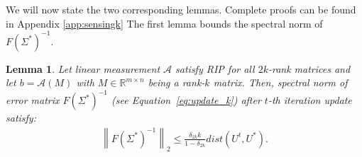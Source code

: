 \documentclass[11pt]{article}
\renewcommand{\eqref}[1]{\hyperref[#1]{(\ref*{#1})}}
\theoremstyle{plain}
\newtheorem{lemma}[theorem]{Lemma}
\theoremstyle{definition}
\newcommand{\rmn}{\mathbb{R}^{m \times n}}
\newcommand{\eqdef}{\stackrel{\textrm{def}}{=}}
\newcommand{\dist}{\mathrm{dist}}
\newcommand{\twonorm}[1]{\left\| {#1} \right\|_2}
\newcommand{\calA}{\mathcal{A}}
\newcommand{\aff}{{\mathcal A}}
\begin{document}
We will now state the two corresponding lemmas.
Complete proofs can be found in Appendix \ref{app:sensingk}
The first lemma bounds the spectral norm of $F(\Sigma^*)^{-1}$.
\begin{lemma}\label{lemma:sensing-twonorm-F}
Let linear measurement $\aff$ satisfy RIP for all $2k$-rank matrices and let $b=\aff(M)$ with $M\in \rmn$ being a rank-$k$ matrix. Then, spectral norm of error matrix $F(\Sigma^*)^{-1}$ (see Equation~\ref{eq:update_k}) after $t$-th iteration update satisfy:
\begin{align}\label{eqn:sensing-twonorm-F}
  \twonorm{F(\Sigma^*)^{-1}} \leq \frac{\delta_{2k} k }{1-\delta_{2k}}dist(U^t, U^*).
\end{align}
\end{lemma}
\end{document}
